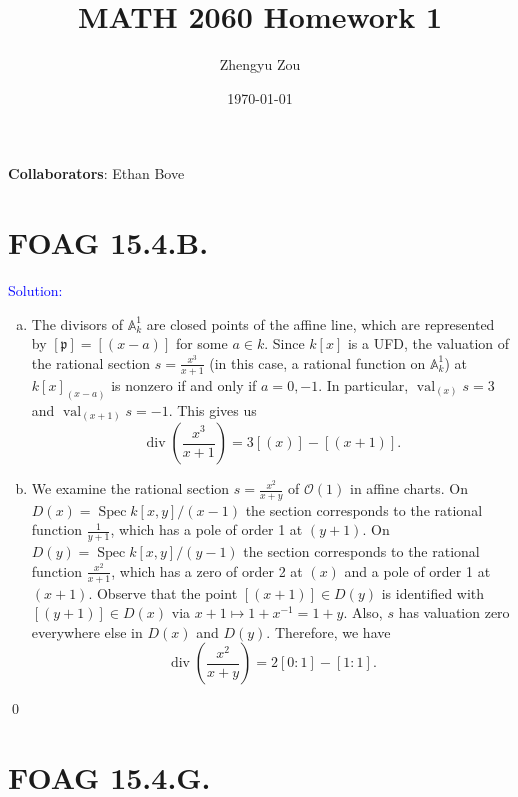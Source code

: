 \documentclass[11pt]{article}
\title{MATH 2060 Homework 1}
\author{Zhengyu Zou}
\date{\today}
\renewcommand{\AA}{\mathbb{A}}
\newcommand{\cO}{\mathcal{O}}
\newcommand{\kp}{\mathfrak{p}}
\DeclareMathOperator{\Spec}{\operatorname{Spec}}
\newcommand{\val}{\operatorname{val}}
\newcommand{\Div}{\operatorname{div}}
\newenvironment{solution}{\begin{trivlist}\item[]{\textcolor{blue}{Solution:}}}{\qed \end{trivlist}}
\begin{document}
\maketitle

\textbf{Collaborators}: Ethan Bove

\section*{FOAG 15.4.B.}

\begin{solution}
\begin{enumerate}[(a)]
    \item The divisors of $\AA_k^1$ are closed points of the affine line, which are represented by $[\kp] = [(x - a)]$ for some $a \in k$. Since $k[x]$ is a UFD, the valuation of the rational section $s = \frac{x^3}{x + 1}$ (in this case, a rational function on $\AA_k^1$) at $k[x]_{(x - a)}$ is nonzero if and only if $a = 0, -1$. In particular, $\val_{(x)} s = 3$ and $\val_{(x+1)} s = -1$. This gives us 
    \begin{equation*}
        \Div \left( \frac{x^3}{x+1} \right) = 3[(x)] - [(x+1)].
    \end{equation*}

    \item We examine the rational section $s = \frac{x^2}{x+y}$ of $\cO(1)$ in affine charts. On $D(x) = \Spec k[x,y]/(x-1)$ the section corresponds to the rational function $\frac{1}{y+1}$, which has a pole of order 1 at $(y + 1)$. On $D(y) = \Spec k[x,y]/(y-1)$ the section corresponds to the rational function $\frac{x^2}{x+1}$, which has a zero of order 2 at $(x)$ and a pole of order 1 at $(x + 1)$. Observe that the point $[(x+1)] \in D(y)$ is identified with $[(y+1)] \in D(x)$ via $x + 1 \mapsto 1 + x^{-1} = 1 + y$. Also, $s$ has valuation zero everywhere else in $D(x)$ and $D(y)$. Therefore, we have 
    \begin{equation*}
        \Div \left( \frac{x^2}{x + y} \right) = 2 [0 : 1] - [1 : 1].
    \end{equation*}
\end{enumerate}
\end{solution}

\newpage

\section*{FOAG 15.4.G.}
\end{document}

